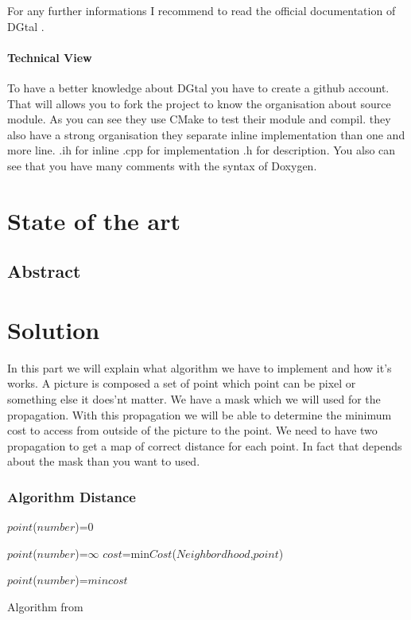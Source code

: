 \documentclass[a4paper,11pt]{report}
\begin{document}
For any further informations I recommend to read the official documentation of DGtal \cite{dgtaldocumentation}.

\subsubsection{Technical View}
To have a better knowledge about DGtal you have to create a github account.
That will allows you to fork the project to know the organisation about source module.
As you can see they use CMake to test their module and compil. they also have a strong organisation
they separate inline implementation than one and more line.
.ih for inline
.cpp for implementation
.h for description.
You also can see that you have many comments with the syntax of Doxygen.


\chapter{State of the art}

\section{Abstract}
\chapter{Solution}
In this part we will explain what algorithm we have to implement and how it's works.
A picture is composed a set of point which point can be pixel or something else it does'nt matter.
We have a mask which we will used for the propagation.
With this propagation we will be able to determine the minimum cost to access from outside of the picture to the point.
We need to have two propagation to get a map of correct distance for each point. In fact that depends about the mask than you want to used. \\

\subsection{Algorithm Distance} 
\begin{algorithm}[H]



{
	{
		$point$($number$)=0 \;
	}
	{
		
		$point$($number$)=$\infty$ \;
		{
			$cost$=min{$Cost$($Neighbordhood$,$point$)}
		}	
	
		$point$($number$)=$mincost$ \;
	}
}

\end{algorithm}
Algorithm from \cite{dgci2011}
\end{document}
